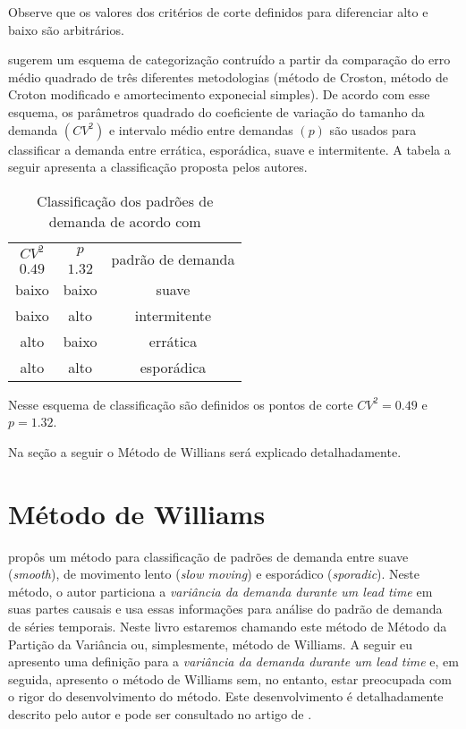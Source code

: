 \documentclass{book}
\begin{document}
Observe que os valores dos critérios de corte definidos para diferenciar alto e baixo são arbitrários.

\cite{SyntetosEtAl2005} sugerem um esquema de categorização contruído a partir da comparação do erro médio quadrado de três diferentes metodologias (método de Croston, método de Croton modificado e amortecimento exponecial simples). De acordo com esse esquema, os parâmetros quadrado do coeficiente de variação do tamanho da demanda $(CV^2)$ e intervalo médio entre demandas $(p)$ são usados para classificar a demanda entre errática, esporádica, suave e intermitente. A tabela a seguir apresenta a classificação proposta pelos autores.

\begin{table}[h]
\begin{center}
\begin{tabular}[c]{c c c}
\cline {1-3}
$CV^2$ & $p$ & \multirow{2}{*}{padrão de demanda} \\ 
$0.49$ & $1.32$ & \\ \cline {1-3}
baixo & baixo & suave   \\ 
baixo & alto  & intermitente   \\ 
alto  & baixo & errática   \\
alto  & alto  & esporádica  \\ \cline {1-3}
\end{tabular}
\caption{Classificação dos padrões de demanda de acordo com \cite{SyntetosEtAl2005}}
\label{tab:DemandPatternSybtetos}
\end{center}
\end{table}

Nesse esquema de classificação são definidos os pontos de corte $CV^2=0.49$ e $p=1.32$.

Na seção a seguir o Método de Willians será explicado detalhadamente.

\section{Método de Williams}
\label{sec:williams}

\cite{Williams1984} propôs um método para classificação de padrões de demanda entre suave (\emph{smooth}), de movimento lento (\emph{slow moving}) e esporádico (\emph{sporadic}). Neste método, o autor particiona a \emph{variância da demanda durante um lead time} em suas partes causais e usa essas informações para análise do padrão de demanda de séries temporais. Neste livro estaremos chamando este método de Método da Partição da Variância ou, simplesmente, método de Williams. A seguir eu apresento uma definição para a \emph{variância da demanda durante um lead time} e, em seguida, apresento o método de Williams sem, no entanto, estar preocupada com o rigor do desenvolvimento do método. Este desenvolvimento é detalhadamente descrito pelo autor e pode ser consultado no artigo de \cite{Williams1984}.
\end{document}
